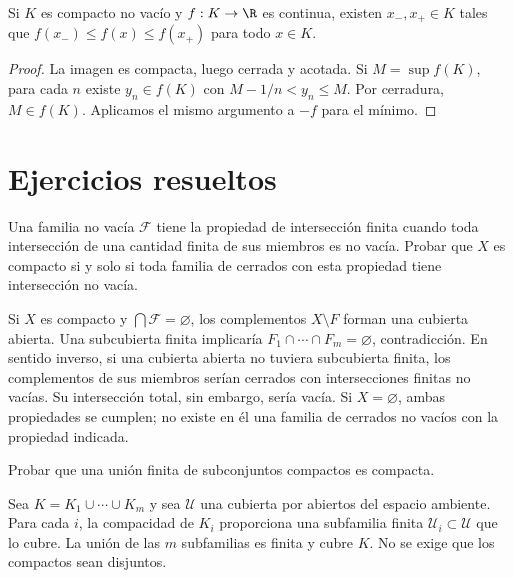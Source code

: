 \begin{corolario}\label{ch13:extremos}
Si $K$ es compacto no vacío y $f:K\to\R$ es continua, existen $x_-,x_+\in K$ tales que $f(x_-)\le f(x)\le f(x_+)$ para todo $x\in K$.
\end{corolario}
\begin{proof}
La imagen es compacta, luego cerrada y acotada. Si $M=\sup f(K)$, para cada $n$ existe $y_n\in f(K)$ con $M-1/n<y_n\le M$. Por cerradura, $M\in f(K)$. Aplicamos el mismo argumento a $-f$ para el mínimo.
\end{proof}

\section{Ejercicios resueltos}
\begin{ejercicio}
Una familia no vacía $\mathcal F$ tiene la propiedad de intersección finita cuando toda intersección de una cantidad finita de sus miembros es no vacía. Probar que $X$ es compacto si y solo si toda familia de cerrados con esta propiedad tiene intersección no vacía.
\end{ejercicio}
\begin{solucion}
Si $X$ es compacto y $\bigcap\mathcal F=\varnothing$, los complementos $X\setminus F$ forman una cubierta abierta. Una subcubierta finita implicaría $F_1\cap\cdots\cap F_m=\varnothing$, contradicción. En sentido inverso, si una cubierta abierta no tuviera subcubierta finita, los complementos de sus miembros serían cerrados con intersecciones finitas no vacías. Su intersección total, sin embargo, sería vacía. Si $X=\varnothing$, ambas propiedades se cumplen; no existe en él una familia de cerrados no vacíos con la propiedad indicada.
\end{solucion}

\begin{ejercicio}
Probar que una unión finita de subconjuntos compactos es compacta.
\end{ejercicio}
\begin{solucion}
Sea $K=K_1\cup\cdots\cup K_m$ y sea $\mathcal U$ una cubierta por abiertos del espacio ambiente. Para cada $i$, la compacidad de $K_i$ proporciona una subfamilia finita $\mathcal U_i\subset\mathcal U$ que lo cubre. La unión de las $m$ subfamilias es finita y cubre $K$. No se exige que los compactos sean disjuntos.
\end{solucion}

